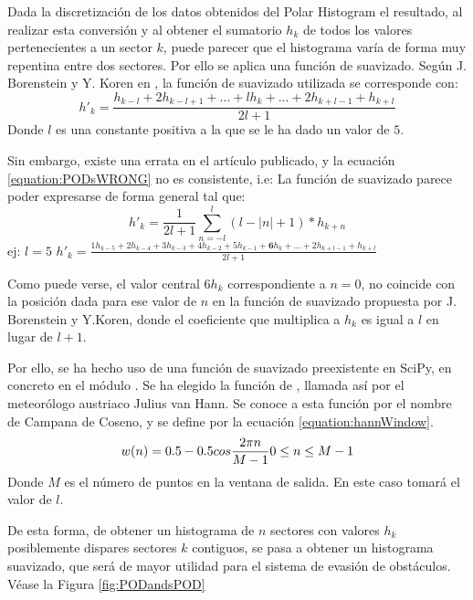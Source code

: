 Dada la discretización de los datos obtenidos del Polar Histogram el resultado, al realizar esta conversión y al obtener el sumatorio $h_k$ de todos los valores pertenecientes a un sector $k$, puede parecer que el histograma varía de forma muy repentina entre dos sectores. Por ello se aplica una función de suavizado. 
Según J. Borenstein y Y. Koren en \citep{art:BorensteinKorenVFH}, la función de suavizado utilizada se corresponde con: 
\begin{equation}
\label{equation:PODsWRONG}
h'_k = \frac{h_{k-l} +2h_{k-l+1} + ... + lh_k + ... + 2h_{k+l-1} + h_{k+l}}{2l+1}
\end{equation}
Donde $l$  es una constante positiva a la que se le ha dado un valor de $5$. 

Sin embargo, existe una errata en el artículo publicado, y la ecuación \ref{equation:PODsWRONG} no es consistente, i.e:
La función de suavizado parece poder expresarse de forma general tal que:
\begin{equation}
\label{equation:PODsWRONGgen}
h'_k =\frac{1}{2l+1} \sum_{n=-l}^{l} (l-  |n| +1)*h_{k+n}
\end{equation}
ej: $l = 5$ $ h'_k = \frac{1h_{k-5} +2h_{k-4} + 3h_{k-3} + 4h_{k-2} + 5h_{k-1} + \textbf{6}h_k + ... + 2h_{k+l-1} + h_{k+l}}{2l+1} $

Como puede verse, el valor central $ 6h_k $ correspondiente a $n=0$, no coincide con la posición dada para ese valor de $n$ en la función de suavizado propuesta por J. Borenstein y Y.Koren, donde el coeficiente que multiplica a $h_k$ es igual a $l$ en lugar de $l+1$.

Por ello, se ha hecho uso de una función de suavizado preexistente en SciPy, en concreto en el módulo . Se ha elegido la función de , llamada así por el meteorólogo austriaco Julius van Hann. Se conoce a esta función por el nombre de Campana de Coseno, y se define por la ecuación \ref{equation:hannWindow}.
\begin{equation}
\label{equation:hannWindow}
w(n)=0.5 - 0.5 cos\frac{2 \pi n}{M-1}\\
0 \leq n \leq M-1
\end{equation}
Donde $M$ es el número de puntos en la ventana de salida. En este caso tomará el valor de $l$.

De esta forma, de obtener un histograma de $n$ sectores con valores $h_k$ posiblemente dispares sectores $k$ contiguos, se pasa a obtener un histograma suavizado, que será de mayor utilidad para el sistema de evasión de obstáculos. Véase la Figura \ref{fig:PODandsPOD}

